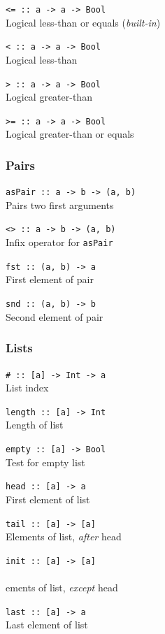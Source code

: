 \texttt{{<=} :: a -> a -> Bool}\ \\
Logical less-than or equals (\emph{built-in})

\texttt{{<} :: a -> a -> Bool}\ \\
Logical less-than

\texttt{{>} :: a -> a -> Bool}\ \\
Logical greater-than

\texttt{{>=} :: a -> a -> Bool}\ \\
Logical greater-than or equals


\subsubsection{Pairs}

\texttt{asPair :: a -> b -> (a, b)}\ \\
Pairs two first arguments

\texttt{{<>} :: a -> b -> (a, b)}\ \\
Infix operator for \texttt{asPair}

\texttt{fst :: (a, b) -> a}\ \\
First element of pair

\texttt{snd :: (a, b) -> b}\ \\
Second element of pair


\subsubsection{Lists}

\texttt{{\#} :: [a] -> Int -> a}\ \\
List index

\texttt{length :: [a] -> Int}\ \\
Length of list

\texttt{empty :: [a] -> Bool}\ \\
Test for empty list

\texttt{head :: [a] -> a}\ \\
First element of list

\texttt{tail :: [a] -> [a]}\ \\
Elements of list, \emph{after} head

\texttt{init :: [a] -> [a]}\ \\\ \\
ements of list, \emph{except} head

\texttt{last :: [a] -> a}\ \\
Last element of list

